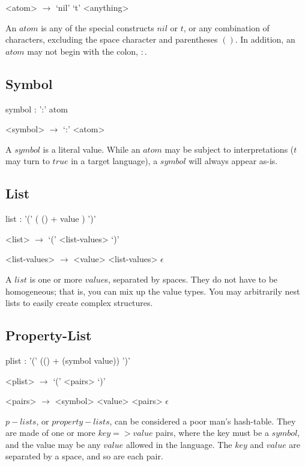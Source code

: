 \documentclass[a4paper]{article}
\begin{document}
\begin{grammar}
	<atom> $\to$ `nil'
		\alt `t'
		\alt <anything>
\end{grammar}

An $atom$ is any of the special constructs $nil$ or $t$, or any combination of characters, excluding the space character and parentheses $()$. In addition, an $atom$ may not begin with the colon, $:$.

\subsection{Symbol}
\begin{rail}
	symbol : ':' atom
\end{rail}

\begin{grammar}
	<symbol> $\to$ `:' <atom>
\end{grammar}

A $symbol$ is a literal value. While an $atom$ may be subject to interpretations ($t$ may turn to $true$ in a target language), a $symbol$ will always appear as-is.


\subsection{List}
\begin{rail}
	list : '(' ( () + value ) ')'
\end{rail}

\begin{grammar}
	<list> $\to$ `(' <list-values> `)'

	<list-values> $\to$ <value> <list-values>
		\alt $\epsilon$
\end{grammar}

A $list$ is one or more $value$s, separated by spaces. They do not have to be homogeneous; that is, you can mix up the value types. You may arbitrarily nest lists to easily create complex structures.


\subsection{Property-List}
\begin{rail}
	plist : '(' (() + (symbol value)) ')'
\end{rail}

\begin{grammar}
	<plist> $\to$ `(' <pairs> `)'

	<pairs> $\to$ <symbol> <value> <pairs>
		\alt $\epsilon$
\end{grammar}

$p-lists$, or $property-lists$, can be considered a poor man's hash-table. They are made of one or more $key => value$ pairs, where the key must be a $symbol$, and the value may be any $value$ allowed in the language. The $key$ and $value$ are separated by a space, and so are each pair.
\end{document}
